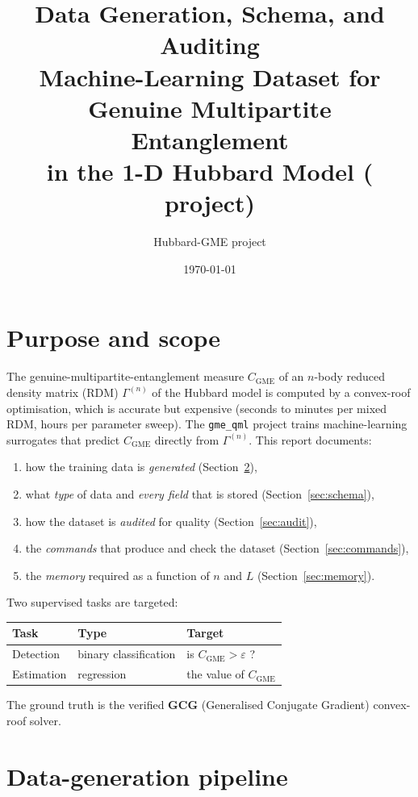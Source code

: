 \documentclass[11pt]{article}
\title{\textbf{Data Generation, Schema, and Auditing}\\[2pt]
       \large Machine-Learning Dataset for Genuine Multipartite Entanglement\\
       in the 1-D Hubbard Model (\code{gme\_qml} project)}
\author{Hubbard-GME project}
\date{\today}
\newcommand{\code}[1]{\texttt{\small #1}}
\newcommand{\CGME}{\ensuremath{C_{\mathrm{GME}}}}
\newcommand{\rdm}{\ensuremath{\Gamma^{(n)}}}
\begin{document}
\maketitle
\tableofcontents
\bigskip

\section{Purpose and scope}
The genuine-multipartite-entanglement measure \CGME{} of an $n$-body reduced
density matrix (RDM) $\rdm$ of the Hubbard model is computed by a convex-roof
optimisation, which is accurate but expensive (seconds to minutes per mixed
RDM, hours per parameter sweep). The \code{gme\_qml} project trains machine-learning
surrogates that predict \CGME{} directly from $\rdm$. This report documents:
\begin{enumerate}[nosep]
  \item how the training data is \emph{generated} (Section~\ref{sec:gen}),
  \item what \emph{type} of data and \emph{every field} that is stored
        (Section~\ref{sec:schema}),
  \item how the dataset is \emph{audited} for quality (Section~\ref{sec:audit}),
  \item the \emph{commands} that produce and check the dataset
        (Section~\ref{sec:commands}),
  \item the \emph{memory} required as a function of $n$ and $L$
        (Section~\ref{sec:memory}).
\end{enumerate}

Two supervised tasks are targeted:
\begin{center}
\begin{tabular}{@{}lll@{}}
\toprule
Task & Type & Target \\
\midrule
Detection  & binary classification & is \CGME{}$>\varepsilon$ ? \\
Estimation & regression            & the value of \CGME{} \\
\bottomrule
\end{tabular}
\end{center}
The ground truth is the verified \textbf{GCG} (Generalised Conjugate Gradient)
convex-roof solver.

\section{Data-generation pipeline}\label{sec:gen}
\end{document}
